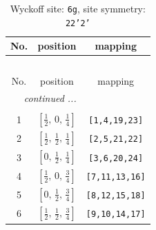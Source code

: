 \documentclass[fleqn,8pt]{jsarticle}
\begin{document}
\renewcommand{\arraystretch}{1.2}
\begin{longtable}{ccc}
\caption{Wyckoff site: {\tt 6g}, site symmetry: {\tt 22'2'}}
 \\
 \hline \hline
No. & position & mapping \\ \hline \endfirsthead

\multicolumn{2}{l}{\tablename\ \thetable{}} \\
 \hline \hline
No. & position & mapping \\ \hline \endhead

 \hline \hline
\multicolumn{2}{r}{\footnotesize\it continued ...} \\ \endfoot

 \hline \hline
\multicolumn{2}{r}{} \\ \endlastfoot

1 & $\left[ \frac{1}{2},\, 0,\, \frac{1}{4} \right]$ & {\tt [1,4,19,23]} \\ \hline
2 & $\left[ \frac{1}{2},\, \frac{1}{2},\, \frac{1}{4} \right]$ & {\tt [2,5,21,22]} \\ \hline
3 & $\left[ 0,\, \frac{1}{2},\, \frac{1}{4} \right]$ & {\tt [3,6,20,24]} \\ \hline
4 & $\left[ \frac{1}{2},\, 0,\, \frac{3}{4} \right]$ & {\tt [7,11,13,16]} \\ \hline
5 & $\left[ 0,\, \frac{1}{2},\, \frac{3}{4} \right]$ & {\tt [8,12,15,18]} \\ \hline
6 & $\left[ \frac{1}{2},\, \frac{1}{2},\, \frac{3}{4} \right]$ & {\tt [9,10,14,17]} \\
\end{longtable}
\renewcommand{\arraystretch}{1.2}
\end{document}
